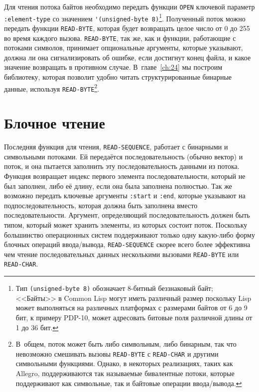 Для чтения потока байтов необходимо передать функции \lstinline{OPEN} ключевой параметр
\lstinline{:element-type} со значением \lstinline{'(unsigned-byte 8)}\footnote{Тип
  \lstinline{(unsigned-byte 8)} обозначает 8-битный беззнаковый байт; <<Байты>> в Common Lisp
  могут иметь различный размер поскольку Lisp может выполняться на различных платформах с
  размерами байтов от 6 до 9 бит, к примеру PDP-10, может адресовать битовые поля
  различной длины от 1 до 36 бит.}\hspace{\footnotenegspace}. Полученный поток можно передать функции
\lstinline{READ-BYTE}, которая будет возвращать целое число от 0 до 255 во время каждого
вызова. \lstinline{READ-BYTE}, так же, как и функции, работающие с потоками символов, принимает
опциональные аргументы, которые указывают, должна ли она сигнализировать об ошибке, если
достигнут конец файла, и какое значение возвращать в противном случае. В~главе~\ref{ch:24}
мы построим библиотеку, которая позволит удобно читать структурированные бинарные данные,
используя \lstinline{READ-BYTE}\footnote{В~общем, поток может быть либо символьным, либо
  бинарным, так что невозможно смешивать вызовы \lstinline{READ-BYTE} с \lstinline{READ-CHAR} и
  другими символьными функциями. Однако, в некоторых реализациях, таких как Allegro,
  поддерживаются так называемые бивалентные потоки, которые поддерживают как символьные,
так и байтовые операции ввода/вывода.}\hspace{\footnotenegspace}.

\section{Блочное чтение}

Последняя функция для чтения, \lstinline{READ-SEQUENCE}, работает с бинарными и символьными
потоками. Ей передаётся последовательность (обычно вектор) и поток, и она пытается
заполнить эту последовательность данными из потока. Функция возвращает индекс первого
элемента последовательности, который не был заполнен, либо её длину, если она была
заполнена полностью. Так же возможно передать ключевые аргументы \lstinline{:start} и
\lstinline{:end}, которые указывают на подпоследовательность, которая должна быть заполнена
вместо последовательности. Аргумент, определяющий последовательность должен быть типом,
который может хранить элементы, из которых состоит поток. Поскольку большинство
операционных систем поддерживают только одну какую-либо форму блочных операций
ввода/вывода, \lstinline{READ-SEQUENCE} скорее всего более эффективна чем чтение
последовательных данных несколькими вызовами \lstinline{READ-BYTE} или \lstinline{READ-CHAR}.

